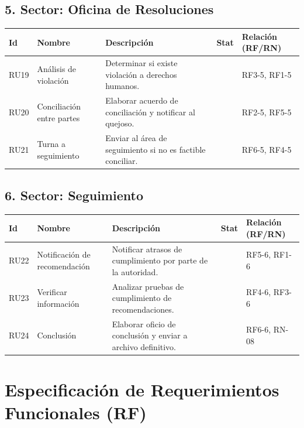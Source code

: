 \documentclass{article}
\begin{document}
\subsection*{5. Sector: Oficina de Resoluciones}

\begin{longtable}{|l|p{3cm}|p{6cm}|c|p{2.5cm}|}
\hline
\textbf{Id} & \textbf{Nombre} & \textbf{Descripción} & \textbf{Stat} & \textbf{Relación (RF/RN)} \\ \hline
RU19 & Análisis de violación & Determinar si existe violación a derechos humanos. & & RF3-5, RF1-5  \\ \hline
RU20 & Conciliación entre partes & Elaborar acuerdo de conciliación y notificar al quejoso. & & RF2-5, RF5-5  \\ \hline
RU21 & Turna a seguimiento & Enviar al área de seguimiento si no es factible conciliar. & & RF6-5, RF4-5  \\ \hline
\end{longtable}

\subsection*{6. Sector: Seguimiento}

\begin{longtable}{|l|p{3cm}|p{6cm}|c|p{2.5cm}|}
\hline
\textbf{Id} & \textbf{Nombre} & \textbf{Descripción} & \textbf{Stat} & \textbf{Relación (RF/RN)} \\ \hline
RU22 & Notificación de recomendación & Notificar atrasos de cumplimiento por parte de la autoridad. & & RF5-6, RF1-6  \\ \hline
RU23 & Verificar información & Analizar pruebas de cumplimiento de recomendaciones. & & RF4-6, RF3-6  \\ \hline
RU24 & Conclusión & Elaborar oficio de conclusión y enviar a archivo definitivo. & & RF6-6, RN-08  \\ \hline
\end{longtable}

\newpage

\section*{Especificación de Requerimientos Funcionales (RF)}
\end{document}
